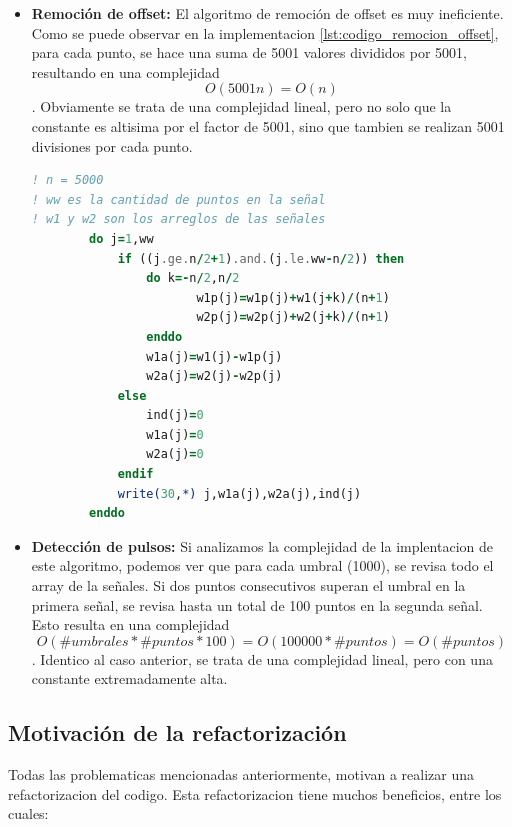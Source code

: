 \documentclass[12pt,a4paper]{article}
\begin{document}
\begin{itemize}
    \item \textbf{Remoción de offset:} El algoritmo de remoción de offset es muy ineficiente. Como se puede observar en la implementacion \ref{lst:codigo_remocion_offset}, para cada punto, se hace una suma de 5001 valores divididos por 5001,
    resultando en una complejidad $$O(5001n) = O(n)$$. Obviamente se trata de una complejidad lineal, pero no solo que la constante es altisima por el factor de 5001, sino que tambien se realizan 5001 divisiones por cada punto.

    \begin{lstlisting}[language=Fortran, label=lst:codigo_remocion_offset]
! n = 5000
! ww es la cantidad de puntos en la señal
! w1 y w2 son los arreglos de las señales
        do j=1,ww
            if ((j.ge.n/2+1).and.(j.le.ww-n/2)) then
                do k=-n/2,n/2
                       w1p(j)=w1p(j)+w1(j+k)/(n+1)
                       w2p(j)=w2p(j)+w2(j+k)/(n+1)            
                enddo
                w1a(j)=w1(j)-w1p(j)
                w2a(j)=w2(j)-w2p(j)
            else 
                ind(j)=0
                w1a(j)=0
                w2a(j)=0
            endif	
            write(30,*) j,w1a(j),w2a(j),ind(j)
        enddo
    \end{lstlisting}


    \item \textbf{Detección de pulsos:} Si analizamos la complejidad de la implentacion de este algoritmo, podemos ver que para cada umbral (1000), se revisa todo el array de la señales. Si dos puntos consecutivos superan el umbral en la primera señal, se revisa hasta un total de 100 puntos en la segunda señal. Esto resulta en una complejidad $$O(\#umbrales * \#puntos * 100) = O(100000 * \#puntos) = O(\#puntos)$$. Identico al caso anterior, se trata de una complejidad lineal, pero con una constante extremadamente alta.
\end{itemize}

\subsection{Motivación de la refactorización}

Todas las problematicas mencionadas anteriormente, motivan a realizar una refactorizacion del codigo. Esta refactorizacion tiene muchos beneficios, entre los cuales:
\end{document}
